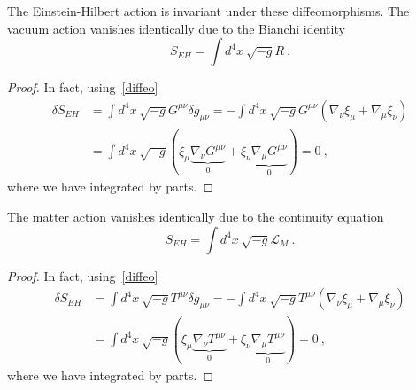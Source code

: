     The Einstein-Hilbert action is invariant under these diffeomorphisms.
    The vacuum action vanishes identically due to the Bianchi identity
    \begin{equation*}
        S_{EH} = \int d^4 x ~ \sqrt{-g} R ~.
    \end{equation*}
    \begin{proof}
        In fact, using~\eqref{diffeo}
        \begin{equation*}
        \begin{aligned}
            \delta S_{EH} & = \int d^4 x ~ \sqrt{-g} G^{\mu\nu} \delta g_{\mu\nu} = - \int d^4 x~ \sqrt{-g} G^{\mu\nu} (\nabla_\nu \xi_{\mu} + \nabla_\mu \xi_{\nu}) \\ & = \int d^4 x~ \sqrt{-g} (\xi_{\mu} \underbrace{\nabla_\nu G^{\mu\nu}}_0 + \xi_{\nu} \underbrace{\nabla_\mu G^{\mu\nu}}_0) = 0 ~,
        \end{aligned}
        \end{equation*}
        where we have integrated by parts.
    \end{proof}
    The matter action vanishes identically due to the continuity equation
    \begin{equation*}
        S_{EH} = \int d^4 x ~ \sqrt{-g} \mathcal L_M ~.
    \end{equation*}
    \begin{proof}
        In fact, using~\eqref{diffeo}
        \begin{equation*}
        \begin{aligned}
            \delta S_{EH} & = \int d^4 x ~ \sqrt{-g} T^{\mu\nu} \delta g_{\mu\nu} = - \int d^4 x~ \sqrt{-g} T^{\mu\nu} (\nabla_\nu \xi_{\mu} + \nabla_\mu \xi_{\nu}) \\ & = \int d^4 x~ \sqrt{-g} (\xi_{\mu} \underbrace{\nabla_\nu T^{\mu\nu}}_0 + \xi_{\nu} \underbrace{\nabla_\mu T^{\mu\nu}}_0) = 0 ~,
        \end{aligned}
        \end{equation*} 
        where we have integrated by parts.
    \end{proof} 
    
